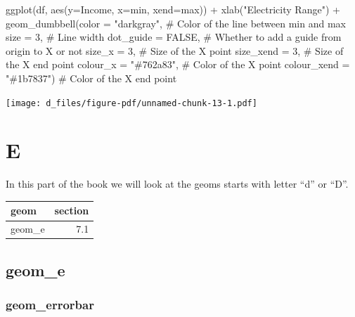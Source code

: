 \documentclass[
  letterpaper,
  DIV=11,
  numbers=noendperiod]{scrreprt}
\newenvironment{Shaded}{\begin{snugshade}}{\end{snugshade}}
\newcommand{\AttributeTok}[1]{\textcolor[rgb]{0.40,0.45,0.13}{#1}}
\newcommand{\CommentTok}[1]{\textcolor[rgb]{0.37,0.37,0.37}{#1}}
\newcommand{\ConstantTok}[1]{\textcolor[rgb]{0.56,0.35,0.01}{#1}}
\newcommand{\DecValTok}[1]{\textcolor[rgb]{0.68,0.00,0.00}{#1}}
\newcommand{\FunctionTok}[1]{\textcolor[rgb]{0.28,0.35,0.67}{#1}}
\newcommand{\NormalTok}[1]{\textcolor[rgb]{0.00,0.23,0.31}{#1}}
\newcommand{\SpecialCharTok}[1]{\textcolor[rgb]{0.37,0.37,0.37}{#1}}
\newcommand{\StringTok}[1]{\textcolor[rgb]{0.13,0.47,0.30}{#1}}
\begin{document}
\begin{Shaded}
\begin{Highlighting}[]
\FunctionTok{ggplot}\NormalTok{(df, }\FunctionTok{aes}\NormalTok{(}\AttributeTok{y=}\NormalTok{Income, }\AttributeTok{x=}\NormalTok{min, }\AttributeTok{xend=}\NormalTok{max)) }\SpecialCharTok{+}
  \FunctionTok{xlab}\NormalTok{(}\StringTok{"Electricity Range"}\NormalTok{) }\SpecialCharTok{+} 
  \FunctionTok{geom\_dumbbell}\NormalTok{(}\AttributeTok{color =} \StringTok{"darkgray"}\NormalTok{,  }\CommentTok{\# Color of the line between min and max}
                \AttributeTok{size =} \DecValTok{3}\NormalTok{,            }\CommentTok{\# Line width}
                \AttributeTok{dot\_guide =} \ConstantTok{FALSE}\NormalTok{,   }\CommentTok{\# Whether to add a guide from origin to X or not}
                \AttributeTok{size\_x =} \DecValTok{3}\NormalTok{,          }\CommentTok{\# Size of the X point}
                \AttributeTok{size\_xend =} \DecValTok{3}\NormalTok{,       }\CommentTok{\# Size of the X end point}
                \AttributeTok{colour\_x =} \StringTok{"\#762a83"}\NormalTok{,    }\CommentTok{\# Color of the X point}
                \AttributeTok{colour\_xend =} \StringTok{"\#1b7837"}\NormalTok{)   }\CommentTok{\# Color of the X end point }
\end{Highlighting}
\end{Shaded}

\texttt{[image: d\_files/figure-pdf/unnamed-chunk-13-1.pdf]}

\part{E}

In this part of the book we will look at the geoms starts with letter
``d'' or ``D''.

\begin{longtable}[]{@{}lr@{}}
\toprule\noalign{}
geom & section \\
\midrule\noalign{}
\endhead
\bottomrule\noalign{}
\endlastfoot
geom\_e & 7.1 \\
\end{longtable}

\chapter{geom\_e}\label{sec-e}

\section{geom\_errorbar}\label{errorbar}
\end{document}
